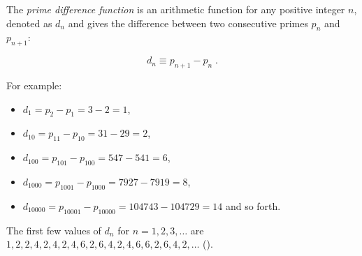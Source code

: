 \documentclass[12pt]{article}
\begin{document}
The {\it prime difference function} is an arithmetic function for any positive integer $n$, denoted as $d_{n}$ and gives the difference between two consecutive primes $p_{n}$ and $p_{n+1}$:

$$ d_{n} \equiv p_{n+1} - p_{n} \; . $$

For example:
\begin{itemize}
\item $d_{1} = p_{2} - p_{1} = 3 - 2 = 1$, 
\item $d_{10} = p_{11} - p_{10} = 31 - 29 = 2$, 
\item $d_{100} = p_{101} - p_{100} = 547 - 541 = 6$, 
\item $d_{1000} = p_{1001} - p_{1000} = 7927 - 7919 = 8$, 
\item $d_{10000} = p_{10001} - p_{10000} = 104743 - 104729 = 14$ and so forth.
\end{itemize}

The first few values of $d_{n}$ for $n = 1, 2, 3, \ldots $ are 
$1, 2, 2, 4, 2, 4, 2, 4, 6, 2, 6, 4, 2, 4, 6, 6, 2, 6, 4, 2, \ldots $
().

\end{document}
